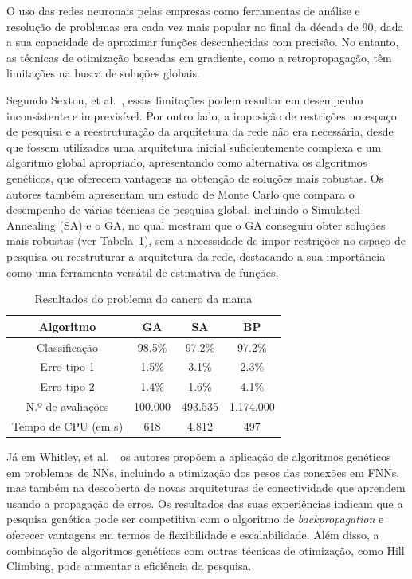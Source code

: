 O uso das redes neuronais pelas empresas como ferramentas de análise e resolução de problemas era cada vez mais popular no final da década de 90, dada a sua capacidade de aproximar funções desconhecidas com precisão.
No entanto, as técnicas de otimização baseadas em gradiente, como a retropropagação, têm limitações na busca de soluções globais.

Segundo Sexton, et al.~\cite{Sexton1998, Sexton1999}, essas limitações podem resultar em desempenho inconsistente e imprevisível.
Por outro lado, a imposição de restrições no espaço de pesquisa e a reestruturação da arquitetura da rede não era necessária, desde que fossem utilizados uma arquitetura inicial suficientemente complexa e um algoritmo global apropriado, apresentando como alternativa os algoritmos genéticos, que oferecem vantagens na obtenção de soluções mais robustas.
Os autores também apresentam um estudo de Monte Carlo que compara o desempenho de várias técnicas de pesquisa global, incluindo o Simulated Annealing (SA) e o GA, no qual mostram que o GA conseguiu obter soluções mais robustas (ver Tabela~\ref{tab:breastcancer}), sem a necessidade de impor restrições no espaço de pesquisa ou reestruturar a arquitetura da rede, destacando a sua importância como uma ferramenta versátil de estimativa de funções.

\begin{table}[htbp]
    \centering
    \caption{Resultados do problema do cancro da mama}
    \begin{tabular}{cccc}
        \hline
        Algoritmo & GA      & SA      & BP        \\ \hline
        Classificação     & 98.5\%  & 97.2\%  & 97.2\%    \\
        Erro tipo-1       & 1.5\%   & 3.1\%   & 2.3\%     \\
        Erro tipo-2       & 1.4\%   & 1.6\%   & 4.1\%     \\
        N.º de avaliações & 100.000 & 493.535 & 1.174.000 \\
        Tempo de CPU (em s)
        & 618     & 4.812   & 497       \\ \hline
    \end{tabular}
    \label{tab:breastcancer}
\end{table}

Já em Whitley, et al.~\cite{Whitley1990}\, os autores propõem a aplicação de algoritmos genéticos em problemas de NNs, incluindo a otimização dos pesos das conexões em FNNs, mas também na descoberta de novas arquiteturas de conectividade que aprendem usando a propagação de erros.
Os resultados das suas experiências indicam que a pesquisa genética pode ser competitiva com o algoritmo de \textit{backpropagation} e oferecer vantagens em termos de flexibilidade e escalabilidade.
Além disso, a combinação de algoritmos genéticos com outras técnicas de otimização, como Hill Climbing, pode aumentar a eficiência da pesquisa.

